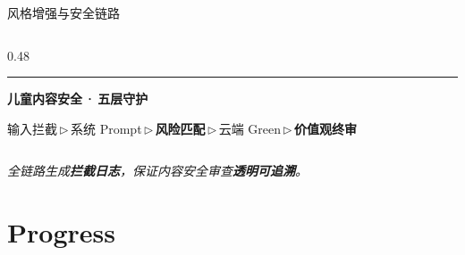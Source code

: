 \documentclass{beamer}
\newcommand{\kw}[1]{\textcolor{importantred}{\textbf{#1}}}
\newcommand{\sidehead}[2][buptred]{%
  {\color{#1}\rule[-0.15em]{2.5pt}{1.0em}}\hspace{0.45em}\textbf{\small\color{darkred}#2}\par
  \vspace{2pt}%
}
\newcommand{\heroline}[1]{%
  {\centering\color{darkred}\itshape\small #1\par}%
}
\begin{document}
\begin{frame}[t]{风格增强与安全链路}
\begin{columns}[T, onlytextwidth]
\begin{column}[T]{0.48\linewidth}
            \par\vspace{4pt}
            \raggedright
            \sidehead[accentgold]{儿童内容安全\,·\,五层守护}
            \footnotesize
            输入拦截\,\textcolor{accentgold}{$\triangleright$}\,系统 Prompt\,\textcolor{accentgold}{$\triangleright$}\,\kw{风险匹配}\,\textcolor{accentgold}{$\triangleright$}\,云端 Green\,\textcolor{accentgold}{$\triangleright$}\,\kw{价值观终审}
        \end{column}
    \end{columns}
    \vspace{0.2cm}
    \heroline{全链路生成\textbf{拦截日志}，保证内容安全审查\textbf{透明可追溯}。}
\end{frame}

\section{Progress}
\end{document}
